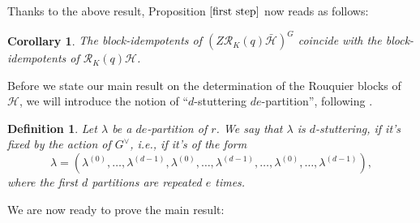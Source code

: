 \documentclass[10pt,a4paper,titlepage]{article}
\newtheorem{definition}[theorem]{Definition}
\newtheorem{corollary}[theorem]{Corollary}
\newcommand{\el}{\lambda}
\begin{document}
Thanks to the above result, Proposition $\ref{first step}$ now reads as follows:

\begin{corollary}\label{third step}
The block-idempotents of $(Z\mathcal{R}_K(q)\bar{\mathcal{H}})^G$ coincide with the block-idempotents of $\mathcal{R}_K(q)\mathcal{H}$.
\end{corollary}

Before we state our main result on the determination of the Rouquier blocks of $\mathcal{H}$, we will introduce the notion of ``$d$-stuttering $de$-partition'', following \cite{Kim}.

\begin{definition}\label{begayante}
Let $\el$ be a $de$-partition of $r$. We say that $\el$ is $d$-stuttering, if it's fixed by the action of 
$G^\vee$, i.e., if it's of the form
$$\el=(\el^{(0)},\ldots,\el^{(d-1)},\el^{(0)},\ldots,\el^{(d-1)},\ldots,\el^{(0)},\ldots,\el^{(d-1)}),$$
 where the first $d$ partitions are repeated $e$ times.
\end{definition} 

We are now ready to prove the main result:
\end{document}
